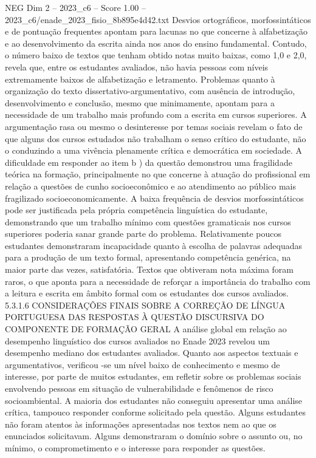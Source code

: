 \begin{textsample}{NEG Dim 2 – 2023\_c6 – Score 1.00 – 2023\_c6/enade\_2023\_fisio\_8b895e4d42.txt}
Desvios ortográficos, morfossintáticos e de pontuação frequentes apontam para lacunas no que concerne à alfabetização e ao desenvolvimento da escrita ainda nos anos do ensino fundamental.
Contudo, o número baixo de textos que tenham obtido notas muito baixas, como 1,0 e 2,0, revela que, entre os estudantes avaliados, não havia pessoas com níveis extremamente baixos de alfabetização e letramento.
Problemas quanto à organização do texto dissertativo-argumentativo, com ausência de introdução, desenvolvimento e conclusão, mesmo que minimamente, apontam para a necessidade de um trabalho mais profundo com a escrita em cursos superiores.
A argumentação rasa ou mesmo o desinteresse por temas sociais revelam o fato de que alguns dos cursos estudados não trabalham o senso crítico do estudante, não o conduzindo a uma vivência plenamente crítica e democrática em sociedade.
A dificuldade em responder ao item b ) da questão demonstrou uma fragilidade teórica na formação, principalmente no que concerne à atuação do profissional em relação a questões de cunho socioeconômico e ao atendimento ao público mais fragilizado socioeconomicamente.
A baixa frequência de desvios morfossintáticos pode ser justificada pela própria competência linguística do estudante, demonstrando que um trabalho mínimo com questões gramaticais nos cursos superiores poderia sanar grande parte do problema.
Relativamente poucos estudantes demonstraram incapacidade quanto à escolha de palavras adequadas para a produção de um texto formal, apresentando competência genérica, na maior parte das vezes, satisfatória.
Textos que obtiveram nota máxima foram raros, o que aponta para a necessidade de reforçar a importância do trabalho com a leitura e escrita em âmbito formal com os estudantes dos cursos avaliados. 5.3.1.6 CONSIDERAÇÕES FINAIS SOBRE A CORREÇÃO DE LÍNGUA PORTUGUESA DAS RESPOSTAS À QUESTÃO DISCURSIVA DO COMPONENTE DE FORMAÇÃO GERAL A análise global em relação ao desempenho linguístico dos cursos avaliados no Enade 2023 revelou um desempenho mediano dos estudantes avaliados.
Quanto aos aspectos textuais e argumentativos, verificou -se um nível baixo de conhecimento e mesmo de interesse, por parte de muitos estudantes, em refletir sobre os problemas sociais envolvendo pessoas em situação de vulnerabilidade e fenômenos de risco socioambiental.
A maioria dos estudantes não conseguiu apresentar uma análise crítica, tampouco responder conforme solicitado pela questão.
Alguns estudantes não foram atentos às informações apresentadas nos textos nem ao que os enunciados solicitavam.
Alguns demonstraram o domínio sobre o assunto ou, no mínimo, o comprometimento e o interesse para responder as questões.

\end{textsample}
